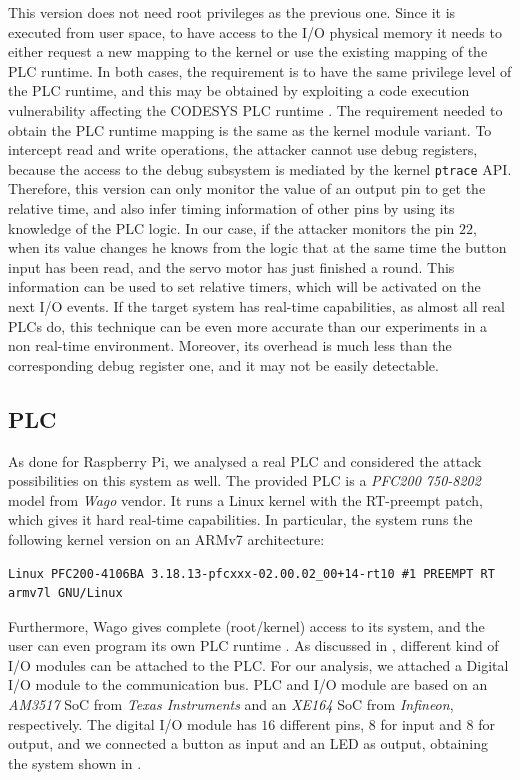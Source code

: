 This version does not need root privileges as the previous one. Since it is executed from user space, to have access to the I/O physical memory it needs to either
request a new mapping to the kernel or use the existing mapping of the PLC runtime. In both cases, the requirement is to have the same privilege level of the PLC runtime,
and this may be obtained by exploiting a code execution vulnerability affecting the CODESYS PLC runtime \cite{abb-codesys,codesys-server}.
The requirement needed to obtain the PLC runtime mapping is the same as the kernel module variant.
To intercept read and write operations, the attacker cannot use debug registers, because the access to the debug subsystem is mediated by the kernel \verb|ptrace| API.
Therefore, this version can only monitor the value of an output pin to get the relative time, and also infer timing information of other pins
by using its knowledge of the PLC logic. In our case, if the attacker monitors the pin $22$, when its value changes he knows from the logic
that at the same time the button input has been read, and the servo motor has just finished a round.
This information can be used to set relative timers, which will be activated on the next I/O events.
If the target system has real-time capabilities, as almost all real PLCs do, this technique can be even more accurate than our experiments in a non real-time environment.
Moreover, its overhead is much less than the corresponding debug register one, and it may not be easily detectable.


\subsection{PLC}
\label{sec:attack_plc}

As done for Raspberry Pi, we analysed a real PLC and considered the attack possibilities on this system as well.
The provided PLC is a \emph{PFC200 750-8202} model from \emph{Wago} vendor. It runs a Linux kernel with the RT-preempt patch, which gives it hard real-time capabilities.
In particular, the system runs the following kernel version on an ARMv7 architecture:
\begin{Verbatim}[fontsize=\small]
  Linux PFC200-4106BA 3.18.13-pfcxxx-02.00.02_00+14-rt10 #1 PREEMPT RT armv7l GNU/Linux
\end{Verbatim}
Furthermore, Wago gives complete (root/kernel) access to its system, and the user can even program its own PLC runtime \cite{wago_linux}.
As discussed in , different kind of I/O modules can be attached to the PLC. For our analysis, we attached a Digital I/O module to the communication bus.
PLC and I/O module are based on an \emph{AM3517} SoC from \emph{Texas Instruments} and an \emph{XE164} SoC from \emph{Infineon}, respectively.
The digital I/O module has $16$ different pins, $8$ for input and $8$ for output, and we connected a button as input and an LED as output,
obtaining the system shown in .

